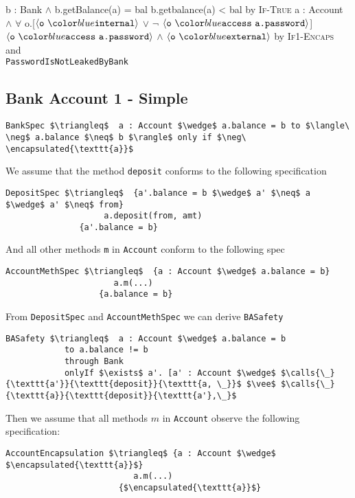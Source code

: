 \begin{proofexample}
\proofsteps
	{\onlyIfEx
			{b : Bank $\wedge$ b.getBalance(a) = bal}
			{b.getbalance(a) < bal}
			{\true}
			}
		{by \textsc{If-True}}
	{\onlyIfSingleEx
			{a : Account $\wedge$ $\forall$ o.[$\internal{\texttt{o}}$ $\vee$ $\neg$ $\access{\texttt{o}}{\texttt{a.password}}$]}
			{$\access{\texttt{o}}{\texttt{a.password}}$ $\wedge$ $\external{\texttt{o}}$}
			{\false}}
		{by \textsc{If1-Encaps} and\\ \texttt{PasswordIsNotLeakedByBank}}
\endproofsteps
\end{proofexample}


\subsection{Bank Account 1 - Simple}
\label{ex:bank1}
\begin{lstlisting}[language = Chainmail, mathescape=true, frame=lines]
BankSpec $\triangleq$  a : Account $\wedge$ a.balance = b to $\langle\ \neg$ a.balance $\neq$ b $\rangle$ only if $\neg\ \encapsulated{\texttt{a}}$
\end{lstlisting}
We assume that the method \texttt{deposit} conforms to the following 
specification
\begin{lstlisting}[language = Chainmail, mathescape=true, frame=lines]
DepositSpec $\triangleq$  {a'.balance = b $\wedge$ a' $\neq$ a $\wedge$ a' $\neq$ from}
					a.deposit(from, amt) 
			   {a'.balance = b}
\end{lstlisting}
And all other methods \texttt{m} in \texttt{Account} conform to the 
following spec
\begin{lstlisting}[language = Chainmail, mathescape=true, frame=lines]
AccountMethSpec $\triangleq$  {a : Account $\wedge$ a.balance = b}
					  a.m(...) 
			       {a.balance = b}
\end{lstlisting}
From \texttt{DepositSpec} and \texttt{AccountMethSpec} we can derive \texttt{BASafety}
\begin{lstlisting}[language = Chainmail, mathescape=true]
BASafety $\triangleq$  a : Account $\wedge$ a.balance = b 
            to a.balance != b
            through Bank
            onlyIf $\exists$ a'. [a' : Account $\wedge$ $\calls{\_}{\texttt{a'}}{\texttt{deposit}}{\texttt{a, \_}}$ $\vee$ $\calls{\_}{\texttt{a}}{\texttt{deposit}}{\texttt{a'},\_}$
\end{lstlisting}
Then we assume that all methods $m$ in \texttt{Account} observe the following specification:
\begin{lstlisting}[language = Chainmail, mathescape=true, frame=lines]
AccountEncapsulation $\triangleq$ {a : Account $\wedge$ $\encapsulated{\texttt{a}}$}
				          a.m(...)
				       {$\encapsulated{\texttt{a}}$}
\end{lstlisting}
